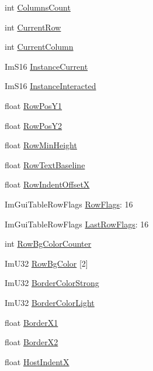 \begin{DoxyCompactItemize}
\item 
int \hyperlink{structImGuiTable_aff0ebae8e79edf5268133b644fb01ee9}{Columns\+Count}
\item 
int \hyperlink{structImGuiTable_a1e188a304ad3d2d30e7defe542bda5d6}{Current\+Row}
\item 
int \hyperlink{structImGuiTable_a944e033f46b7729d15b8946d06dbe682}{Current\+Column}
\item 
Im\+S16 \hyperlink{structImGuiTable_a79fe77ae5bb4b1280fcfbbd2e98ad882}{Instance\+Current}
\item 
Im\+S16 \hyperlink{structImGuiTable_ac0ff33b9c82c9405189c4130a165cfdc}{Instance\+Interacted}
\item 
float \hyperlink{structImGuiTable_af9b476f4a6582468c0ed0a019548d022}{Row\+Pos\+Y1}
\item 
float \hyperlink{structImGuiTable_a48403ef1b4c11fe3c7d4df835b2f7a82}{Row\+Pos\+Y2}
\item 
float \hyperlink{structImGuiTable_af23ea5ea747d5c2daffc7954cf4df66c}{Row\+Min\+Height}
\item 
float \hyperlink{structImGuiTable_af517dd5ce92ebaf84982083485507634}{Row\+Text\+Baseline}
\item 
float \hyperlink{structImGuiTable_abac804d6f3bd10e7920924eb3bf9067c}{Row\+Indent\+OffsetX}
\item 
Im\+Gui\+Table\+Row\+Flags \hyperlink{structImGuiTable_ae5b7b9728836e1928cc1b838f9aa74ef}{Row\+Flags}\+: 16
\item 
Im\+Gui\+Table\+Row\+Flags \hyperlink{structImGuiTable_adccfcf7b8e9670d762f9df1df0c5d6b6}{Last\+Row\+Flags}\+: 16
\item 
int \hyperlink{structImGuiTable_a6e6aa2309557862d7da9d6970c0f2f0b}{Row\+Bg\+Color\+Counter}
\item 
Im\+U32 \hyperlink{structImGuiTable_a252e602ec807bf532edd501110bdc7b1}{Row\+Bg\+Color} \mbox{[}2\mbox{]}
\item 
Im\+U32 \hyperlink{structImGuiTable_a936d4880c94acaaf59a1bdaafd4fb9cf}{Border\+Color\+Strong}
\item 
Im\+U32 \hyperlink{structImGuiTable_ac79c118ebe0c19a00fd0e6a83c7fcfd5}{Border\+Color\+Light}
\item 
float \hyperlink{structImGuiTable_a5e3562f22a0b19142111c8c5c297dc69}{Border\+X1}
\item 
float \hyperlink{structImGuiTable_a01d72b316dbb8d9af031f0f139ce65f3}{Border\+X2}
\item 
float \hyperlink{structImGuiTable_ad568622dbcfc53bef54e644a74a6abdc}{Host\+IndentX}

\end{DoxyCompactItemize}
